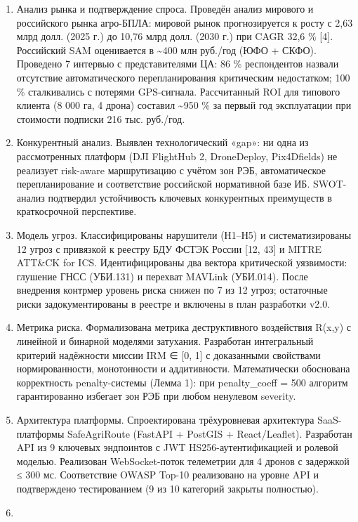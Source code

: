 \documentclass[14pt,a4paper]{extarticle}
\begin{document}
\begin{enumerate}
\def\labelenumi{\arabic{enumi}.}
\item
  Анализ рынка и подтверждение спроса. Проведён анализ мирового и российского рынка агро-БПЛА: мировой рынок прогнозируется к росту с 2,63 млрд долл. (2025 г.) до 10,76 млрд долл. (2030 г.) при CAGR 32,6 \% {[}4{]}. Российский SAM оценивается в \textasciitilde400 млн руб./год (ЮФО + СКФО). Проведено 7 интервью с представителями ЦА: 86 \% респондентов назвали отсутствие автоматического перепланирования критическим недостатком; 100 \% сталкивались с потерями GPS-сигнала. Рассчитанный ROI для типового клиента (8 000 га, 4 дрона) составил \textasciitilde950 \% за первый год эксплуатации при стоимости подписки 216 тыс. руб./год.
\item
  Конкурентный анализ. Выявлен технологический «gap»: ни одна из рассмотренных платформ (DJI FlightHub 2, DroneDeploy, Pix4Dfields) не реализует risk-aware маршрутизацию с учётом зон РЭБ, автоматическое перепланирование и соответствие российской нормативной базе ИБ. SWOT-анализ подтвердил устойчивость ключевых конкурентных преимуществ в краткосрочной перспективе.
\item
  Модель угроз. Классифицированы нарушители (Н1--Н5) и систематизированы 12 угроз с привязкой к реестру БДУ ФСТЭК России {[}12, 43{]} и MITRE ATT\&CK for ICS. Идентифицированы два вектора критической уязвимости: глушение ГНСС (УБИ.131) и перехват MAVLink (УБИ.014). После внедрения контрмер уровень риска снижен по 7 из 12 угроз; остаточные риски задокументированы в реестре и включены в план разработки v2.0.
\item
  Метрика риска. Формализована метрика деструктивного воздействия R(x,y) с линейной и бинарной моделями затухания. Разработан интегральный критерий надёжности миссии IRM ∈ {[}0, 1{]} с доказанными свойствами нормированности, монотонности и аддитивности. Математически обоснована корректность penalty-системы (Лемма 1): при penalty\_coeff = 500 алгоритм гарантированно избегает зон РЭБ при любом ненулевом severity.
\item
  Архитектура платформы. Спроектирована трёхуровневая архитектура SaaS-платформы SafeAgriRoute (FastAPI + PostGIS + React/Leaflet). Разработан API из 9 ключевых эндпоинтов с JWT HS256-аутентификацией и ролевой моделью. Реализован WebSocket-поток телеметрии для 4 дронов с задержкой ≤ 300 мс. Соответствие OWASP Top-10 реализовано на уровне API и подтверждено тестированием (9 из 10 категорий закрыты полностью).
\item

\end{enumerate}
\end{document}
